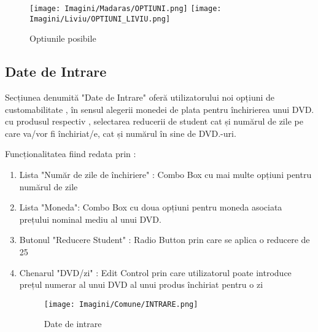\documentclass{amsart}
\begin{document}
\hfill \newline

\begin{figure}[h]
\centering
\texttt{[image: Imagini/Madaras/OPTIUNI.png]}
\texttt{[image: Imagini/Liviu/OPTIUNI\_LIVIU.png]}
\caption{Optiunile posibile}
\end{figure}


\hfill \newline

\newpage %


\subsection{Date de Intrare}

Secțiunea denumită "Date de Intrare" oferă utilizatorului noi opțiuni de customabilitate , în sensul alegerii monedei de plata pentru închirierea unui DVD. cu produsul respectiv , selectarea reducerii de student cat și numărul de zile pe care va/vor fi închiriat/e, cat și numărul în sine de DVD.-uri.

\hfill \newline

Funcționalitatea fiind redata prin : 

\hfill \newline

\begin{enumerate}[label=\arabic*.]
\item Lista "Număr de zile de închiriere" : Combo Box cu mai multe opțiuni pentru numărul de zile

\hfill \newline

\item Lista "Moneda": Combo Box cu doua opțiuni pentru moneda asociata prețului nominal mediu al unui DVD.

\hfill \newline

\item Butonul "Reducere Student" : Radio Button prin care se aplica o reducere de 25%

\hfill \newline

\item Chenarul "DVD/zi" : Edit Control prin care utilizatorul poate introduce prețul numerar al unui DVD al unui produs închiriat pentru o zi

\hfill \newline


\begin{figure}[h]
\centering
\texttt{[image: Imagini/Comune/INTRARE.png]}
\caption{Date de intrare}
\end{figure}


\hfill \newline

\end{enumerate}
\end{document}
